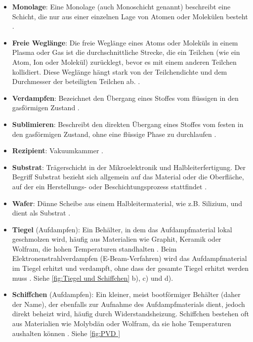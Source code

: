 \documentclass{article} %
\begin{document}
\begin{itemize}
    \item \textbf{Monolage}: Eine Monolage (auch Monoschicht genannt) beschreibt eine Schicht, die nur aus einer einzelnen Lage von Atomen oder 
    Molekülen besteht \cite{kittel2004}.
    \item \textbf{Freie Weglänge}: Die freie Weglänge eines Atoms oder Moleküls in einem Plasma oder Gas ist die durchschnittliche Strecke, 
    die ein Teilchen (wie ein Atom, Ion oder Molekül) zurücklegt, bevor es mit einem anderen Teilchen kollidiert. Diese Weglänge hängt stark 
    von der Teilchendichte und dem Durchmesser der beteiligten Teilchen ab. \cite{kittel2004}.
    \item \textbf{Verdampfen}: Bezeichnet den Übergang eines Stoffes vom flüssigen in den gasförmigen Zustand \cite{kittel2004}.
    \item \textbf{Sublimieren}: Beschreibt den direkten Übergang eines Stoffes vom festen in den gasförmigen Zustand, ohne eine flüssige Phase 
    zu durchlaufen \cite{kittel2004}.
    \item \textbf{Rezipient}: Vakuumkammer \cite{keplinger2024, ohring2002}.
    \item \textbf{Substrat}: Trägerschicht in der Mikroelektronik und Halbleiterfertigung. Der Begriff Substrat bezieht sich allgemein auf das 
    Material oder die Oberfläche, auf der ein Herstellungs- oder Beschichtungsprozess stattfindet \cite{ohring2002}.
    \item \textbf{Wafer}: Dünne Scheibe aus einem Halbleitermaterial, wie z.B. Silizium, und dient als Substrat \cite{sze2006}.
    \item \textbf{Tiegel} (Aufdampfen): Ein Behälter, in dem das Aufdampfmaterial lokal geschmolzen wird, häufig aus Materialien wie Graphit, 
    Keramik oder Wolfram, die hohen Temperaturen standhalten \cite{smith1995, ohring2002}. Beim Elektronenstrahlverdampfen (E-Beam-Verfahren) wird das 
    Aufdampfmaterial im Tiegel erhitzt und verdampft, ohne dass der gesamte Tiegel erhitzt werden muss \cite{smith1995}. Siehe
    \autoref{fig:Tiegel und Schiffchen} b), c) und d).
    \item \textbf{Schiffchen} (Aufdampfen): Ein kleiner, meist bootförmiger Behälter (daher der Name), der 
    ebenfalls zur Aufnahme des Aufdampfmaterials dient, jedoch direkt beheizt wird, häufig durch Widerstandsheizung. Schiffchen bestehen oft aus 
    Materialien wie Molybdän oder Wolfram, da sie hohe Temperaturen aushalten können \cite{mattox2010handbook, ohring2002}. Siehe \autoref{fig:PVD 
}
\end{itemize}
\end{document}
